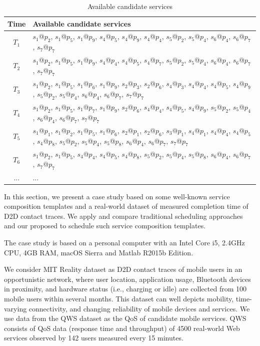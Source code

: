 \documentclass[journal]{IEEEtran}
\begin{document}
\begin{table}[!t]
\renewcommand{\arraystretch}{1.7}
\caption{Available candidate services}
\label{Available candidate services}
\centering
\begin{tabular}{c l}
\hline
\bfseries Time & \bfseries Available candidate services\\
\hline
$T_1$     & $s_1$@$p_2$, $s_1$@$p_5$, $s_1$@$p_9$, $s_4$@$p_5$, $s_4$@$p_9$, $s_4$@$p_4$, $s_5$@$p_2$, $s_5$@$p_4$, $s_6$@$p_4$, $s_6$@$p_7$, $s_7$@$p_7$ \\
$T_2$     & $s_1$@$p_2$, $s_1$@$p_5$, $s_1$@$p_9$, $s_4$@$p_4$, $s_4$@$p_5$, $s_4$@$p_7$, $s_5$@$p_2$, $s_5$@$p_4$, $s_6$@$p_4$, $s_6$@$p_7$, $s_7$@$p_7$ \\
$T_3$     & $s_1$@$p_2$, $s_1$@$p_5$, $s_1$@$p_6$, $s_1$@$p_9$, $s_2$@$p_3$, $s_2$@$p_6$, $s_4$@$p_3$, $s_4$@$p_4$, $s_4$@$p_5$, $s_4$@$p_9$, $s_5$@$p_2$, $s_5$@$p_4$, $s_6$@$p_4$, $s_6$@$p_7$, $s_7$@$p_7$ \\
$T_4$     & $s_1$@$p_2$, $s_1$@$p_5$, $s_1$@$p_7$, $s_1$@$p_9$, $s_2$@$p_6$, $s_4$@$p_4$, $s_4$@$p_5$, $s_4$@$p_9$, $s_5$@$p_2$, $s_5$@$p_4$, $s_6$@$p_4$, $s_6$@$p_7$, $s_7$@$p_7$ \\
$T_5$     & $s_1$@$p_1$, $s_1$@$p_2$, $s_1$@$p_5$, $s_1$@$p_6$, $s_2$@$p_1$, $s_2$@$p_6$, $s_3$@$p_1$, $s_4$@$p_1$, $s_4$@$p_4$, $s_4$@$p_5$, $s_4$@$p_8$, $s_5$@$p_2$, $s_5$@$p_4$, $s_5$@$p_8$, $s_6$@$p_4$, $s_6$@$p_7$, $s_7$@$p_7$ \\
$T_6$     & $s_1$@$p_2$, $s_1$@$p_5$, $s_4$@$p_4$, $s_4$@$p_5$, $s_4$@$p_8$, $s_5$@$p_2$, $s_5$@$p_4$, $s_5$@$p_8$, $s_6$@$p_4$, $s_6$@$p_7$, $s_7$@$p_7$ \\
... & ...\\
\hline
\end{tabular}
\end{table}


In this section, we present a case study based on some well-known service composition templates and a real-world dataset of measured completion time of D2D contact traces. We apply and compare traditional scheduling approaches and our proposed to schedule such service composition templates.

The case study is based on a personal computer with an Intel Core i5, 2.4GHz CPU, 4GB RAM, macOS Sierra and Matlab R2015b Edition.

We consider MIT Reality dataset \cite{eagle2006reality} as D2D contact traces of mobile users in an opportunistic network, where user location, application usage, Bluetooth devices in proximity, and hardware status (i.e., charging or idle) are collected from 100 mobile users within several months. This dataset can well depicts mobility, time-varying connectivity, and changing reliability of mobile devices and services. 
We use data from the QWS dataset \cite{zheng2014investigating} as the QoS of candidate mobile services. 
QWS consists of QoS data (response time and throughput) of 4500 real-world Web services observed by 142 users measured every 15 minutes.
\end{document}
